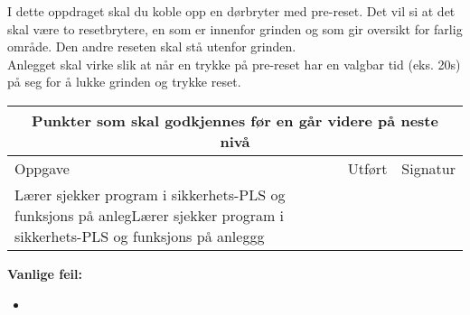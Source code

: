 I dette oppdraget skal du koble opp en dørbryter med pre-reset. Det vil si at det skal være to resetbrytere, en som er innenfor grinden og som gir oversikt for farlig område. Den andre reseten skal stå utenfor grinden. \\
Anlegget skal virke slik at når en trykke på pre-reset har en valgbar tid (eks. 20s) på seg for å lukke grinden og trykke reset. 
\begin{center}
\begin{tabular}{ | m{8cm} | m{1cm}| m{2cm} | } 
\hline
\multicolumn{3}{|c|}{Punkter som skal godkjennes før en går videre på neste nivå} \\
	\hline
	Oppgave	& Utført & Signatur \\ 
	\hline
Lærer sjekker program i sikkerhets-PLS og funksjons på anlegLærer sjekker program i sikkerhets-PLS og funksjons på anleggg& & \\ 
	\hline
\end{tabular}
\end{center}
\textbf{Vanlige feil:}
\begin{itemize}[noitemsep]
	\item 
\end{itemize}
\newpage




